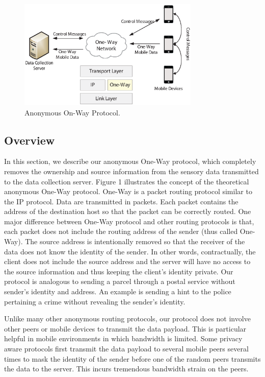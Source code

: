 
\begin{figure}[!b]
\begin{center}
\includegraphics[width=3.4in]{one-way.eps}
\caption{Anonymous On-Way Protocol.} \label{fig:Stupendous}
\end{center}
\end{figure}


\subsection{Overview}\label{proto-overview}

In this section, we describe our anonymous One-Way protocol, which
completely removes the ownership and source information from the
sensory data transmitted to the data collection server. Figure 1
illustrates the concept of the theoretical anonymous One-Way
protocol. One-Way is a packet routing protocol similar to the IP
protocol. Data are transmitted in packets. Each packet contains
the address of the destination host so that the packet can be
correctly routed. One major difference between One-Way protocol
and other routing protocols is that, each packet does not include
the routing address of the sender (thus called One-Way). The
source address is intentionally removed so that the receiver of
the data does not know the identity of the sender. In other words,
contractually, the client does not include the source address and
the server will have no access to the source information and thus
keeping the client's identity private. Our protocol is analogous
to sending a parcel through a postal service without sender's
identity and address. An example is sending a hint to the police
pertaining a crime without revealing the sender's identity.

Unlike many other anonymous routing protocols, our protocol does
not involve other peers or mobile devices to transmit the data
payload. This is particular helpful in mobile environments in
which bandwidth is limited. Some privacy aware protocols first
transmit the data payload to several mobile peers several times to
mask the identity of the sender before one of the random peers
transmits the data to the server. This incurs tremendous bandwidth
strain on the peers.

